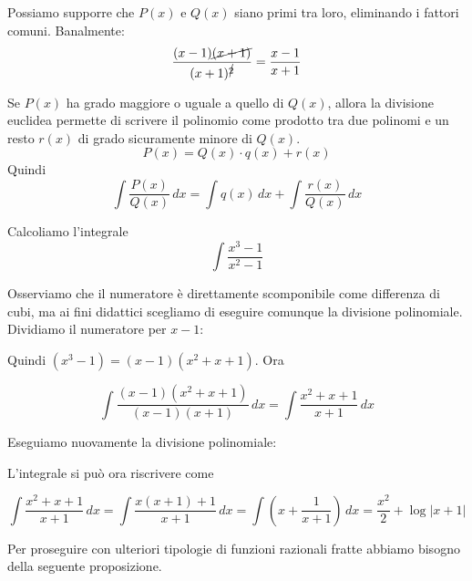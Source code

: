 Possiamo supporre che $P(x)$ e $Q(x)$ siano primi tra loro, eliminando i fattori comuni. Banalmente:
\begin{equation*}
\frac{(x-1)\cancel{(x+1)}}{(x+1)^{\cancel{2}}} = \frac{x-1}{x+1}
\end{equation*}

Se $P(x)$ ha grado maggiore o uguale a quello di $Q(x)$, allora la divisione euclidea permette di scrivere il polinomio come prodotto tra due polinomi e un resto $r(x)$ di grado sicuramente minore di $Q(x)$.
\begin{equation*}
P(x) = Q(x) \cdot q(x) + r(x)
\end{equation*}
Quindi
\begin{equation*}
\int \frac{P(x)}{Q(x)} \, dx = \int q(x) \, dx + \int \frac{r(x)}{Q(x)} \, dx
\end{equation*}

\begin{example}
Calcoliamo l'integrale
\begin{equation*}
\int \frac{x^3-1}{x^2-1}
\end{equation*}

Osserviamo che il numeratore è direttamente scomponibile come differenza di cubi, ma ai fini didattici scegliamo di eseguire comunque la divisione polinomiale. Dividiamo il numeratore per $x-1$:

\begin{center}
\end{center}

Quindi $(x^3-1) = (x-1)(x^2+x+1)$. Ora

\begin{equation*}
\int \frac{(x-1)(x^2+x+1)}{(x-1)(x+1)} \, dx = \int \frac{x^2+x+1}{x+1} \, dx
\end{equation*}

Eseguiamo nuovamente la divisione polinomiale:
\begin{center}
\end{center}

L'integrale si può ora riscrivere come

\begin{equation*}
\int \frac{x^2+x+1}{x+1} \, dx = \int \frac{x(x+1)+1}{x+1} \, dx = \int \left(x + \frac{1}{x+1} \right) \, dx = \frac{x^2}{2} + \log|x+1|
\end{equation*}
\end{example}

Per proseguire con ulteriori tipologie di funzioni razionali fratte abbiamo bisogno della seguente proposizione.

